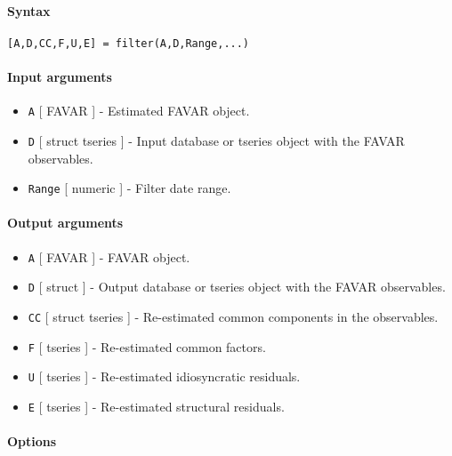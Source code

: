


	\paragraph{Syntax}

\begin{verbatim}
[A,D,CC,F,U,E] = filter(A,D,Range,...)
\end{verbatim}

\paragraph{Input arguments}

\begin{itemize}
\item
  \texttt{A} {[} FAVAR {]} - Estimated FAVAR object.
\item
  \texttt{D} {[} struct \textbar{} tseries {]} - Input database or
  tseries object with the FAVAR observables.
\item
  \texttt{Range} {[} numeric {]} - Filter date range.
\end{itemize}

\paragraph{Output arguments}

\begin{itemize}
\item
  \texttt{A} {[} FAVAR {]} - FAVAR object.
\item
  \texttt{D} {[} struct {]} - Output database or tseries object with the
  FAVAR observables.
\item
  \texttt{CC} {[} struct \textbar{} tseries {]} - Re-estimated common
  components in the observables.
\item
  \texttt{F} {[} tseries {]} - Re-estimated common factors.
\item
  \texttt{U} {[} tseries {]} - Re-estimated idiosyncratic residuals.
\item
  \texttt{E} {[} tseries {]} - Re-estimated structural residuals.
\end{itemize}

\paragraph{Options}

